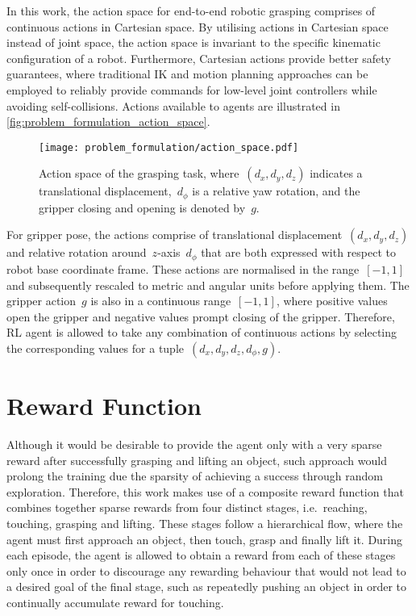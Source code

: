 In this work, the action space for end-to-end robotic grasping comprises of continuous actions in Cartesian space. By utilising actions in Cartesian space instead of joint space, the action space is invariant to the specific kinematic configuration of a robot. Furthermore, Cartesian actions provide better safety guarantees, where traditional IK and motion planning approaches can be employed to reliably provide commands for low-level joint controllers while avoiding self-collisions. Actions available to agents are illustrated in \autoref{fig:problem_formulation_action_space}.

\begin{figure}[b]
    \centering
    \texttt{[image: problem\_formulation/action\_space.pdf]}
    \caption{Action space of the grasping task, where~\((d_{x},d_{y},d_{z})\) indicates a translational displacement,~\(d_{\phi}\) is a relative yaw rotation, and the gripper closing and opening is denoted by~\(g\).}
    \label{fig:problem_formulation_action_space}
\end{figure}

For gripper pose, the actions comprise of translational displacement~\((d_{x},d_{y},d_{z})\) and relative rotation around~\(z\)-axis~\(d_{\phi}\) that are both expressed with respect to robot base coordinate frame. These actions are normalised in the range~\([-1, 1]\) and subsequently rescaled to metric and angular units before applying them. The gripper action~\(g\) is also in a continuous range~\([-1, 1]\), where positive values open the gripper and negative values prompt closing of the gripper. Therefore, RL agent is allowed to take any combination of continuous actions by selecting the corresponding values for a tuple~\((d_{x},d_{y},d_{z},d_{\phi},g)\).


\section{Reward Function}

Although it would be desirable to provide the agent only with a very sparse reward after successfully grasping and lifting an object, such approach would prolong the training due the sparsity of achieving a success through random exploration. Therefore, this work makes use of a composite reward function that combines together sparse rewards from four distinct stages, i.e.~reaching, touching, grasping and lifting. These stages follow a hierarchical flow, where the agent must first approach an object, then touch, grasp and finally lift it. During each episode, the agent is allowed to obtain a reward from each of these stages only once in order to discourage any rewarding behaviour that would not lead to a desired goal of the final stage, such as repeatedly pushing an object in order to continually accumulate reward for touching.

